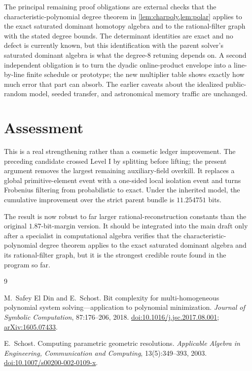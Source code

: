 \documentclass[11pt]{article}
\theoremstyle{definition}
\begin{document}
The principal remaining proof obligations are external checks that the characteristic-polynomial degree theorem in \cref{lem:charpoly,lem:polar} applies to the exact saturated dominant homotopy algebra and to the rational-filter graph with the stated degree bounds.  The determinant identities are exact and no defect is currently known, but this identification with the parent solver's saturated dominant algebra is what the degree-$8$ retuning depends on.  A second independent obligation is to turn the dyadic online-product envelope into a line-by-line finite schedule or prototype; the new multiplier table shows exactly how much error that part can absorb.  The earlier caveats about the idealized public-random model, seeded transfer, and astronomical memory traffic are unchanged.

\section{Assessment}

This is a real strengthening rather than a cosmetic ledger improvement.  The preceding candidate crossed Level I by splitting before lifting; the present argument removes the largest remaining auxiliary-field overkill.  It replaces a global primitive-element event with a one-sided local isolation event and turns Frobenius filtering from probabilistic to exact.  Under the inherited model, the cumulative improvement over the strict parent bundle is $11.254751$ bits.

The result is now robust to far larger rational-reconstruction constants than the original $1.87$-bit-margin version.  It should be integrated into the main draft only after a specialist in computational algebra verifies that the characteristic-polynomial degree theorem applies to the exact saturated dominant algebra and its rational-filter graph, but it is the strongest credible route found in the program so far.

\begin{thebibliography}{9}
\scriptsize
\setlength{\itemsep}{0.1em}
\setlength{\parskip}{0pt}

M.~Safey El Din and E.~Schost.
\newblock Bit complexity for multi-homogeneous polynomial system solving---application to polynomial minimization.
\newblock \emph{Journal of Symbolic Computation}, 87:176--206, 2018.
\newblock \href{https://doi.org/10.1016/j.jsc.2017.08.001}{doi:10.1016/j.jsc.2017.08.001}; \href{https://arxiv.org/abs/1605.07433}{arXiv:1605.07433}.

E.~Schost.
\newblock Computing parametric geometric resolutions.
\newblock \emph{Applicable Algebra in Engineering, Communication and Computing}, 13(5):349--393, 2003.
\newblock \href{https://doi.org/10.1007/s00200-002-0109-x}{doi:10.1007/s00200-002-0109-x}.

\end{thebibliography}
\end{document}
